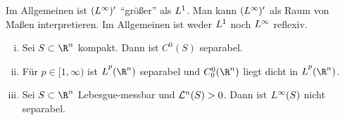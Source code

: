 \nnBemerkung
Im Allgemeinen ist $(L^{\infty})'$ \enquote{größer} als $L^{1}$.
Man kann $(L^{\infty})'$ als Raum von Maßen interpretieren.
Im Allgemeinen ist weder $L^{1}$ noch $L^{\infty}$ reflexiv.

\begin{thSatz}
    \begin{enumerate}[(i)]
        \item
            Sei $S\subset\R^n$ kompakt. Dann ist $C^0(S)$ separabel.
        \item
            Für $p\in[1,\infty)$ ist $\Lpp(\R^n)$ separabel und
            $\Coo(\R^n)$ liegt dicht in $\Lpp(\R^n)$.
        \item
            Sei $S\subset\R^n$ Lebesgue-messbar und $\mathcal{L}^n(S)>0$. Dann ist
            $L^{\infty}(S)$ nicht separabel.
    \end{enumerate}
\end{thSatz}


